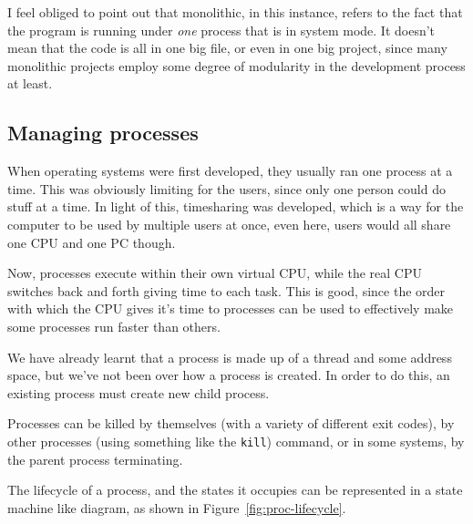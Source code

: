 
I feel obliged to point out that monolithic, in this instance, refers to the
fact that the program is running under \textit{one} process that is in system
mode. It doesn't mean that the code is all in one big file, or even in one big
project, since many monolithic projects employ some degree of modularity in
the development process at least.

\subsection{Managing processes}

When operating systems were first developed, they usually ran one process at a
time. This was obviously limiting for the users, since only one person could do
stuff at a time. In light of this, timesharing was developed, which is a way for
the computer to be used by multiple users at once, even here, users would all
share one CPU and one PC though.

Now, processes execute within their own virtual CPU, while the real CPU switches
back and forth giving time to each task. This is good, since the order with
which the CPU gives it's time to processes can be used to effectively make some
processes run faster than others.

We have already learnt that a process is made up of a thread and some address
space,  but we've not been over how a process is
created. In order to do this, an existing process must create new child process.

Processes can be killed by themselves (with a variety of different exit codes),
by other processes (using something like the \texttt{kill}) command, or in some
systems, by the parent process terminating.

The lifecycle of a process, and the states it occupies can be represented in a
state machine like diagram, as shown in Figure~\ref{fig:proc-lifecycle}.

